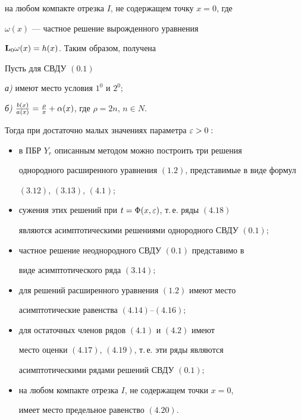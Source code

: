 на любом компакте отрезка $I$, не содержащем точку $x = 0$, где


$\omega (x)$ --- частное решение вырожденного уравнения


$\bold{L}_0 \omega (x) = h (x)$. Таким образом, получена





\begin{thmnonum}


Пусть для СВДУ $(0.1)$


{\em а)} имеют место условия $1^0$ и $2^0;$





{\em б)} $\frac{b(x)}{a(x)}=\frac{\rho}{x} + \aa(x)$, где $\rho =


2n$, $n \in N$.





\noindent{}Тогда при достаточно малых значениях параметра $\varepsilon>0:$


\begin{itemize}


\item[1)] в ПБР $Y_r$ описанным методом можно построить три решения


однородного расширенного уравнения $(1.2)$, представимые в виде формул


$(3.12)$, $(3.13)$, $(4.1);$


\item[2)] сужения этих решений при $t=\Phi(x,\varepsilon)$, т.\,е. ряды $(4.18)$


являются асимптотическими решениями однородного СВДУ $(0.1);$


\item[3)] частное решение неоднородного СВДУ $(0.1)$ представимо в


виде асимптотического ряда $(3.14);$


\item[4)] для решений расширенного уравнения $(1.2)$ имеют место


асимптотические равенства $(4.14)$--$(4.16);$


\item[5)] для остаточных членов рядов $(4.1)$ и $(4.2)$ имеют


место оценки $(4.17)$, $(4.19)$, т.\,е. эти ряды являются 


асимптотическими рядами решений СВДУ $(0.1);$


\item[6)] на любом компакте отрезка $I$, не содержащем точки $x=0$,


имеет место предельное равенство $(4.20)$.


\end{itemize}


\end{thmnonum}





